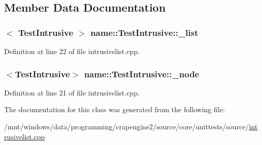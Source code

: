 \subsection{Member Data Documentation}
\hypertarget{classname_1_1_test_intrusive_a8881f33d937f971bacdacbdb4a85f0a8}{
\subsubsection[{\+\_\+list}]{$<$ {\bf Test\+Intrusive} $>$ name\+::\+Test\+Intrusive\+::\+\_\+list\hspace{0.3cm}{\ttfamily [static]}}}\label{classname_1_1_test_intrusive_a8881f33d937f971bacdacbdb4a85f0a8}


Definition at line 22 of file intrusivelist.\+cpp.

\hypertarget{classname_1_1_test_intrusive_a760f804cb22c2193d33c1c95202060ff}{
\subsubsection[{\+\_\+node}]{$<${\bf Test\+Intrusive}$>$ name\+::\+Test\+Intrusive\+::\+\_\+node}}\label{classname_1_1_test_intrusive_a760f804cb22c2193d33c1c95202060ff}


Definition at line 21 of file intrusivelist.\+cpp.



The documentation for this class was generated from the following file\+:\begin{DoxyCompactItemize}
\item 
/mnt/windows/data/programming/crapengine2/source/core/unittests/source/\hyperlink{intrusivelist_8cpp}{intrusivelist.\+cpp}\end{DoxyCompactItemize}
